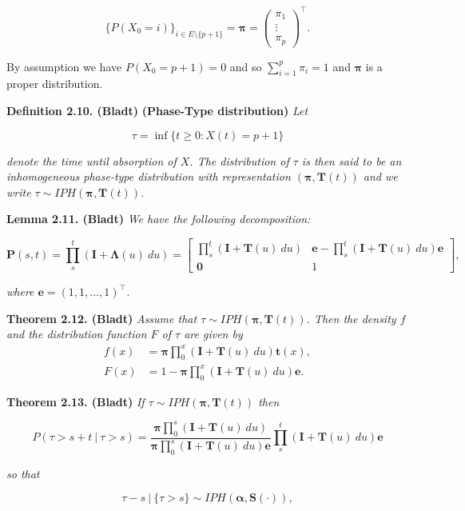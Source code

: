 \documentclass[a4paper,12pt,openany]{book}
\begin{document}
\[
\{P(X_0=i)\}_{i\in E\setminus \{p+1\}}=\mathbf{\pi}=\begin{pmatrix}\pi_1\\ \vdots\\ \pi_p\end{pmatrix}^\top.
\]

By assumption we have \(P(X_0=p+1)=0\) and so \(\sum_{i=1}^p\pi_i=1\) and \(\mathbf{\pi}\) is a proper distribution.

\textbf{Definition 2.10. (Bladt)} \textbf{(Phase-Type distribution)} \emph{Let}

\[
\tau = \inf\{t\ge 0 : X(t)=p+1\}
\]

\emph{denote the time until absorption of \(X\). The distribution of \(\tau\) is then said to be an inhomogeneous phase-type distribution with representation \((\mathbf{\pi},\mathbf{T}(t))\) and we write \(\tau \sim IPH(\mathbf{\pi},\mathbf{T}(t))\).}

\textbf{Lemma 2.11. (Bladt)} \emph{We have the following decomposition:}

\[
\mathbf{P}(s,t)=\prod_s^t(\mathbf{I}+\mathbf{\Lambda}(u)\ du)=
\begin{bmatrix}
\prod_s^t(\mathbf{I}+\mathbf{T}(u)\ du) & \mathbf{e} -\prod_s^t(\mathbf{I}+\mathbf{T}(u)\ du)\mathbf{e}\\
\mathbf{0} & 1
\end{bmatrix},
\]

\emph{where \(\mathbf{e}=(1,1,...,1)^\top\).}

\textbf{Theorem 2.12. (Bladt)} \emph{Assume that \(\tau \sim IPH(\mathbf{\pi},\mathbf{T}(t))\). Then the density \(f\) and the distribution function \(F\) of \(\tau\) are given by}
\begin{align*}
f(x)&=\mathbf{\pi}\prod_0^x(\mathbf{I}+\mathbf{T}(u)\ du)\mathbf{t}(x),\\
F(x)&=1-\mathbf{\pi}\prod_0^x(\mathbf{I}+\mathbf{T}(u)\ du)\mathbf{e}.
\end{align*}

\textbf{Theorem 2.13. (Bladt)} \emph{If \(\tau \sim IPH(\mathbf{\pi},\mathbf{T}(t))\) then}

\[
P(\tau >s+t\ \vert\ \tau >s)=\frac{\mathbf{\pi}\prod_0^s(\mathbf{I}+\mathbf{T}(u)\ du)}{\mathbf{\pi}\prod_0^s(\mathbf{I}+\mathbf{T}(u)\ du)\mathbf{e}}\prod_s^t(\mathbf{I}+\mathbf{T}(u)\ du)\mathbf{e}
\]

\emph{so that}

\[
\tau-s\ \vert\ \{\tau>s\}\sim IPH(\mathbf{\alpha},\mathbf{S}(\cdot)),
\]
\end{document}

